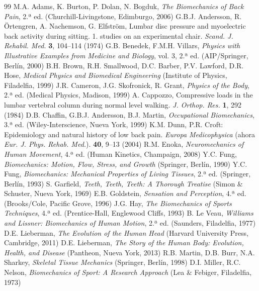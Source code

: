\documentclass[12pt]{book}
\begin{document}
\begin{thebibliography}{99}
 M.A. Adams, K. Burton, P. Dolan, N. Bogduk, \textit{The Biomechanics of Back Pain}, 2.ª ed. (Churchill-Livingstone, Edimburgo, 2006)
 G.B.J. Andersson, R. Örtengren, A. Nachemson, G. Elfström, Lumbar disc pressure and myoelectric back activity during sitting. 1. studies on an experimental chair. \textit{Scand. J. Rehabil. Med.} \textbf{3}, 104--114 (1974)
 G.B. Benedek, F.M.H. Villars, \textit{Physics with Illustrative Examples from Medicine and Biology}, vol. 3, 2.ª ed. (AIP/Springer, Berlín, 2000)
 B.H. Brown, R.H. Smallwood, D.C. Barber, P.V. Lawford, D.R. Hose, \textit{Medical Physics and Biomedical Engineering} (Institute of Physics, Filadelfia, 1999)
 J.R. Cameron, J.G. Skofronick, R. Grant, \textit{Physics of the Body}, 2.ª ed. (Medical Physics, Madison, 1999)
 A. Cappozzo, Compressive loads in the lumbar vertebral column during normal level walking. \textit{J. Orthop. Res.} \textbf{1}, 292 (1984)
 D.B. Chaffin, G.B.J. Andersson, B.J. Martin, \textit{Occupational Biomechanics}, 3.ª ed. (Wiley-Interscience, Nueva York, 1999)
 K.M. Dunn, P.R. Croft: Epidemiology and natural history of low back pain. \textit{Europa Medicophysica} (ahora \textit{Eur. J. Phys. Rehab. Med.}). \textbf{40}, 9--13 (2004)
 R.M. Enoka, \textit{Neuromechanics of Human Movement}, 4.ª ed. (Human Kinetics, Champaign, 2008)
 Y.C. Fung, \textit{Biomechanics: Motion, Flow, Stress, and Growth} (Springer, Berlín, 1990)
 Y.C. Fung, \textit{Biomechanics: Mechanical Properties of Living Tissues}, 2.ª ed. (Springer, Berlín, 1993)
 S. Garfield, \textit{Teeth, Teeth, Teeth: A Thorough Treatise} (Simon \& Schuster, Nueva York, 1969)
 E.B. Goldstein, \textit{Sensation and Perception}, 4.ª ed. (Brooks/Cole, Pacific Grove, 1996)
 J.G. Hay, \textit{The Biomechanics of Sports Techniques}, 4.ª ed. (Prentice-Hall, Englewood Cliffs, 1993)
 B. Le Veau, \textit{Williams and Lissner: Biomechanics of Human Motion}, 2.ª ed. (Saunders, Filadelfia, 1977)
 D.E. Lieberman, \textit{The Evolution of the Human Head} (Harvard University Press, Cambridge, 2011)
 D.E. Lieberman, \textit{The Story of the Human Body: Evolution, Health, and Disease} (Pantheon, Nueva York, 2013)
 R.B. Martin, D.B. Burr, N.A. Sharkey, \textit{Skeletal Tissue Mechanics} (Springer, Berlín, 1998)
 D.I. Miller, R.C. Nelson, \textit{Biomechanics of Sport: A Research Approach} (Lea \& Febiger, Filadelfia, 1973)

\end{thebibliography}
\end{document}

